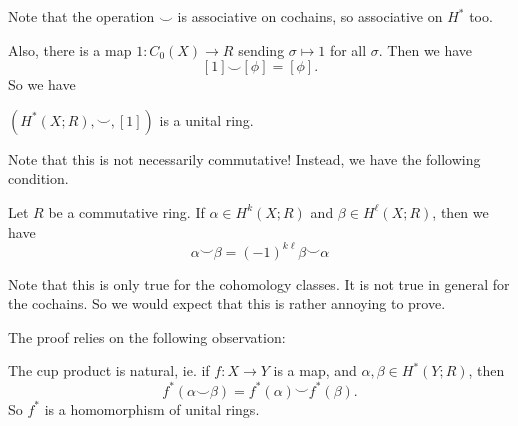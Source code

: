 \documentclass[a4paper]{article}
\theoremstyle{definition}
\begin{document}
Note that the operation $\smile$ is associative on cochains, so associative on $H^*$ too.

Also, there is a map $1: C_0(X) \to R$ sending $\sigma \mapsto 1$ for all $\sigma$. Then we have
\[
  [1] \smile [\phi] = [\phi].
\]
So we have
\begin{prop}
  $(H^*(X; R), \smile, [1])$ is a unital ring.
\end{prop}

Note that this is not necessarily commutative! Instead, we have the following  condition.
\begin{prop}
  Let $R$ be a commutative ring. If $\alpha \in H^k(X; R)$ and $\beta \in H^\ell(X; R)$, then we have
  \[
    \alpha \smile \beta = (-1)^{k\ell}\beta \smile \alpha
  \]
\end{prop}

Note that this is only true for the cohomology classes. It is not true in general for the cochains. So we would expect that this is rather annoying to prove.

The proof relies on the following observation:

\begin{prop}
  The cup product is natural, ie. if $f: X \to Y$ is a map, and $\alpha, \beta \in H^*(Y; R)$, then
  \[
    f^*(\alpha \smile \beta) = f^*(\alpha) \smile f^*(\beta).
  \]
  So $f^*$ is a homomorphism of unital rings.
\end{prop}
\end{document}
